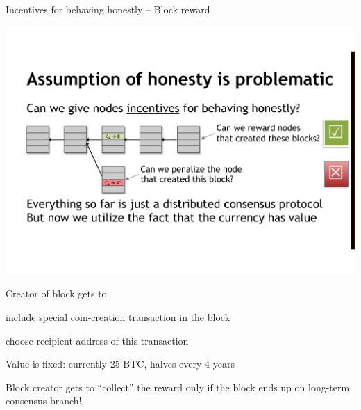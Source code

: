 \begin{frame}{Incentives for behaving honestly -- Block reward}
	
\includegraphics[width=\textwidth]{reward}

\BIL
\item Creator of block gets to
	\BI
	\item include special coin-creation transaction in the block
	\item choose recipient address of this transaction
	\EI
\item Value is fixed: currently 25 BTC, halves every 4 years
\item Block creator gets to “collect” the reward only if the block ends up on long-term consensus branch!
\EIL
	
\end{frame}

